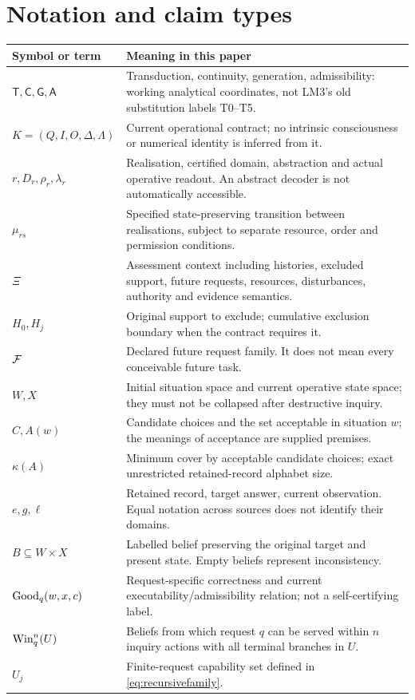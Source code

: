 \clearpage
\appendix
\section{Notation and claim types}

\begin{longtable}{@{}p{.20\linewidth}p{.73\linewidth}@{}}
\toprule
Symbol or term & Meaning in this paper\\
\midrule
\endhead
\(\mathsf T,\mathsf C,\mathsf G,\mathsf A\) & Transduction, continuity, generation, admissibility: working analytical coordinates, not LM3's old substitution labels T0--T5.\\
\(K=(Q,I,O,\Delta,\Lambda)\) & Current operational contract; no intrinsic consciousness or numerical identity is inferred from it.\\
\(r,D_r,\rho_r,\lambda_r\) & Realisation, certified domain, abstraction and actual operative readout. An abstract decoder is not automatically accessible.\\
\(\mu_{rs}\) & Specified state-preserving transition between realisations, subject to separate resource, order and permission conditions.\\
\(\Xi\) & Assessment context including histories, excluded support, future requests, resources, disturbances, authority and evidence semantics.\\
\(H_0,H_j\) & Original support to exclude; cumulative exclusion boundary when the contract requires it.\\
\(\mathcal F\) & Declared future request family. It does not mean every conceivable future task.\\
\(W,X\) & Initial situation space and current operative state space; they must not be collapsed after destructive inquiry.\\
\(C,A(w)\) & Candidate choices and the set acceptable in situation \(w\); the meanings of acceptance are supplied premises.\\
\(\kappa(A)\) & Minimum cover by acceptable candidate choices; exact unrestricted retained-record alphabet size.\\
\(e,g,\ell\) & Retained record, target answer, current observation. Equal notation across sources does not identify their domains.\\
\(B\subseteq W\times X\) & Labelled belief preserving the original target and present state. Empty beliefs represent inconsistency.\\
\(\operatorname{Good}_q(w,x,c)\) & Request-specific correctness and current executability/admissibility relation; not a self-certifying label.\\
\(\operatorname{Win}_q^n(U)\) & Beliefs from which request \(q\) can be served within \(n\) inquiry actions with all terminal branches in \(U\).\\
\(U_j\) & Finite-request capability set defined in \eqref{eq:recursivefamily}.\\
\bottomrule
\end{longtable}

